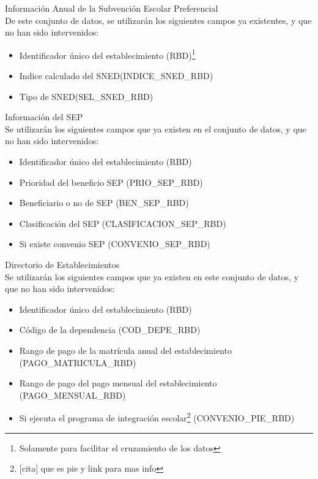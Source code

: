\begin{longdescription}
        \item[Información Anual de la Subvención Escolar Preferencial] \hfill \\
         De este conjunto de datos, se utilizarán los siguientes campos ya existentes, y que no han sido intervenidos:
            \begin{itemize}
                \item Identificador único del establecimiento (RBD)\footnote{Solamente para facilitar el cruzamiento de los datos}
                \item Indice calculado del SNED(INDICE\_SNED\_RBD)
                \item Tipo de SNED(SEL\_SNED\_RBD)
            \end{itemize}
        \item[Información del SEP] \hfill \\
        Se utilizarán los siguientes campos que ya existen en el conjunto de datos, y que no han sido intervenidos:
            \begin{itemize}
              \item Identificador único del establecimiento (RBD)
              \item Prioridad del beneficio SEP (PRIO\_SEP\_RBD)
              \item Beneficiario o no de SEP (BEN\_SEP\_RBD)
              \item Clasificación del SEP (CLASIFICACION\_SEP\_RBD)
              \item Si existe convenio SEP (CONVENIO\_SEP\_RBD)
            \end{itemize}
        \item[Directorio de Establecimientos] \hfill \\
            Se utilizarán los siguientes campos que ya existen en este conjunto de datos, y que no han sido intervenidos:
            \begin{itemize}
              \item Identificador único del establecimiento (RBD)
              \item Código de la dependencia (COD\_DEPE\_RBD)
              \item Rango de pago de la matrícula anual del establecimiento (PAGO\_MATRICULA\_RBD)
              \item Rango de pago del pago mensual del establecimiento (PAGO\_MENSUAL\_RBD)
              \item Si ejecuta el programa de integración escolar\footnote{[cita] que es pie y link para mas info} (CONVENIO\_PIE\_RBD)

\end{itemize}
\end{longdescription}
